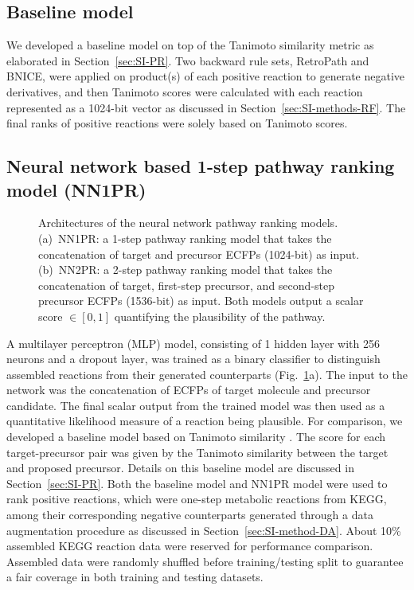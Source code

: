 \documentclass{article}
\begin{document}
\subsection{Baseline model}
We developed a baseline model on top of the Tanimoto similarity metric as elaborated in Section~\ref{sec:SI-PR}.
Two backward rule sets, RetroPath and BNICE, were applied on product(s) of each positive reaction to generate negative derivatives, and then Tanimoto scores were calculated with each reaction represented as a 1024-bit vector as discussed in Section~\ref{sec:SI-methods-RF}.
The final ranks of positive reactions were solely based on Tanimoto scores. 

\subsection{Neural network based 1-step pathway ranking model (NN1PR)}
\begin{figure}
\centering
    
    \caption{Architectures of the neural network pathway ranking models. (a)~NN1PR: a 1-step pathway ranking model that takes the concatenation of target and precursor ECFPs (1024-bit) as input. (b)~NN2PR: a 2-step pathway ranking model that takes the concatenation of target, first-step precursor, and second-step precursor ECFPs (1536-bit) as input. Both models output a scalar score $\in [0,1]$ quantifying the plausibility of the pathway.}
    \label{fig:model_architectures}
\end{figure}

A multilayer perceptron (MLP) model, consisting of 1 hidden layer with 256 neurons and a dropout layer, was trained as a binary classifier to distinguish assembled reactions from their
generated counterparts (Fig.~\ref{fig:model_architectures}a). 
The input to the network was the concatenation of ECFPs of target molecule and precursor candidate.
The final scalar output from the trained model was then used as a quantitative likelihood measure of a reaction being plausible.
For comparison, we developed a baseline model based on Tanimoto similarity \citep{tanimoto1958elementary}.
The score for each target-precursor pair was given by the Tanimoto similarity between the target and proposed precursor.
Details on this baseline model are discussed in Section~\ref{sec:SI-PR}.
Both the baseline model and NN1PR model were used to rank positive reactions, which were one-step metabolic reactions from KEGG, among their corresponding negative counterparts generated through a data augmentation procedure as discussed in Section~\ref{sec:SI-method-DA}. 
About 10\% assembled KEGG reaction data were reserved for performance comparison. Assembled data were randomly shuffled before training/testing split to guarantee a fair coverage in both training and testing datasets.
\end{document}
